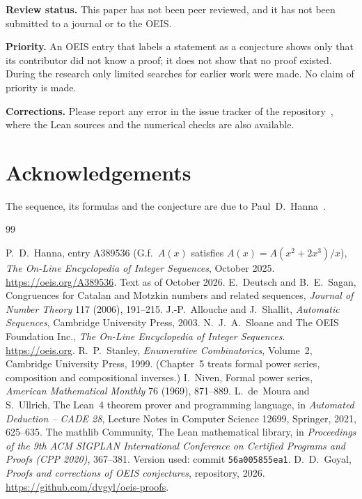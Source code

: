 \documentclass[11pt,a4paper]{article}
\theoremstyle{definition}
\theoremstyle{remark}
\newcommand{\para}[1]{\par\medskip\noindent\textbf{#1}\enspace}
\begin{document}
\para{Review status.} This paper has not been peer reviewed, and it has not been submitted to a journal or to the OEIS.

\para{Priority.} An OEIS entry that labels a statement as a conjecture shows only that its contributor did not know
a proof; it does not show that no proof existed. During the research only limited searches for earlier work were
made. No claim of priority is made.

\para{Corrections.} Please report any error in the issue tracker of the repository~\cite{repo}, where the Lean sources and the numerical checks are also
available.

\section*{Acknowledgements}
The sequence, its formulas and the conjecture are due to Paul~D.~Hanna~\cite{oeis}.

\begin{thebibliography}{99}\small
\raggedright
{} P.~D.~Hanna, entry A389536 (G.f.\ $A(x)$ satisfies $A(x)=A(x^2+2x^3)/x$), \emph{The On-Line Encyclopedia of Integer Sequences}, October 2025. \url{https://oeis.org/A389536}. Text as of October 2026.
 E.~Deutsch and B.~E.~Sagan, Congruences for Catalan and Motzkin numbers and related sequences, \emph{Journal of Number Theory} 117 (2006), 191--215.
 J.-P.~Allouche and J.~Shallit, \emph{Automatic Sequences}, Cambridge University Press, 2003.
 N.~J.~A.~Sloane and The OEIS Foundation Inc., \emph{The On-Line Encyclopedia of Integer Sequences}. \url{https://oeis.org}.
 R.~P.~Stanley, \emph{Enumerative Combinatorics}, Volume~2, Cambridge University Press, 1999. (Chapter~5 treats formal power series, composition and compositional inverses.)
 I.~Niven, Formal power series, \emph{American Mathematical Monthly} 76 (1969), 871--889.
 L.~de~Moura and S.~Ullrich, The Lean~4 theorem prover and programming language, in \emph{Automated Deduction -- CADE 28}, Lecture Notes in Computer Science 12699, Springer, 2021, 625--635.
 The mathlib Community, The Lean mathematical library, in \emph{Proceedings of the 9th ACM SIGPLAN International Conference on Certified Programs and Proofs (CPP 2020)}, 367--381. Version used: commit \texttt{56a005855ea1}.
 D.~D.~Goyal, \emph{Proofs and corrections of OEIS conjectures}, repository, 2026. \url{https://github.com/dvgyl/oeis-proofs}.
\end{thebibliography}
\end{document}
